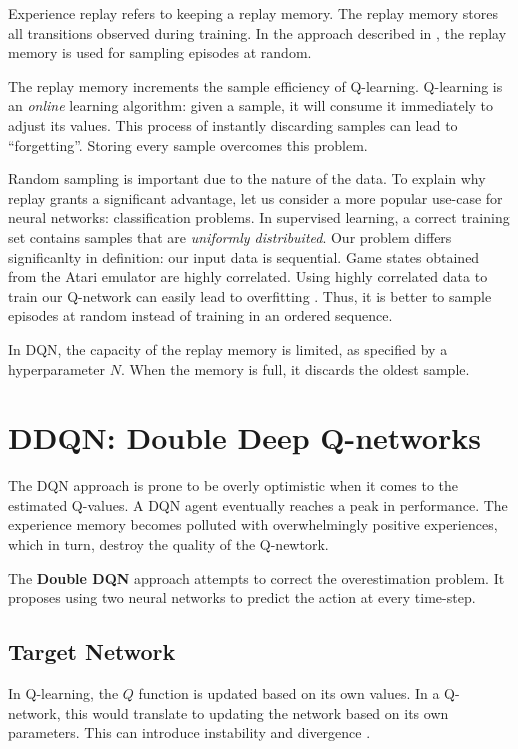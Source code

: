 Experience replay refers to keeping a replay memory.
The replay memory stores all transitions observed during training.
In the approach described in \cite{atari-dqn}, the replay memory is used for sampling episodes at random.

The replay memory increments the sample efficiency of Q-learning.
Q-learning is an \emph{online} learning algorithm: given a sample, it will consume it immediately to adjust its values.
This process of instantly discarding samples can lead to ``forgetting''.
Storing every sample overcomes this problem.

Random sampling is important due to the nature of the data.
To explain why replay grants a significant advantage, let us consider a more popular use-case for neural networks: classification problems.
In supervised learning, a correct training set contains samples that are \emph{uniformly distribuited}.
Our problem differs significanlty in definition: our input data is sequential.
Game states obtained from the Atari emulator are highly correlated.
Using highly correlated data to train our Q-network can easily lead to overfitting \cite{jaromiru-dqn}.
Thus, it is better to sample episodes at random instead of training in an ordered sequence.

In DQN, the capacity of the replay memory is limited, as specified by a hyperparameter \(N\). When the memory is full, it discards the oldest sample.

\section{DDQN: Double Deep Q-networks}
The DQN approach is prone to be overly optimistic when it comes to the estimated Q-values.
A DQN agent eventually reaches a peak in performance.
The experience memory becomes polluted with overwhelmingly positive experiences, which in turn, destroy the quality of the Q-newtork.

The \textbf{Double DQN} \cite{ddqn-paper} approach attempts to correct the overestimation problem.
It proposes using two neural networks to predict the action at every time-step.

\subsection{Target Network}

In Q-learning, the \(Q\) function is updated based on its own values.
In a Q-network, this would translate to updating the network based on its own parameters. This can introduce instability and divergence \cite{jaromiru-dqn}.

